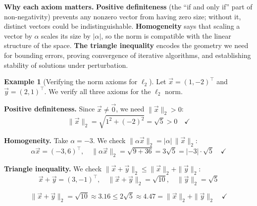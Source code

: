 \documentclass[10pt, twocolumn]{article}
\theoremstyle{definition}
\newtheorem{example}{Example}
\theoremstyle{plain}
\begin{document}
\begin{center}
\end{center}

\textbf{Why each axiom matters.}
\textbf{Positive definiteness} (the ``if and only if'' part of non-negativity) prevents any nonzero vector from having zero size; without it, distinct vectors could be indistinguishable.
\textbf{Homogeneity} says that scaling a vector by $\alpha$ scales its size by $|\alpha|$, so the norm is compatible with the linear structure of the space.
\textbf{The triangle inequality} encodes the geometry we need for bounding errors, proving convergence of iterative algorithms, and establishing stability of solutions under perturbation.

\begin{example}[Verifying the norm axioms for $\ell_2$]
Let $\vec{x} = (1, -2)^\top$ and $\vec{y} = (2, 1)^\top$. We verify all three axioms for the $\ell_2$ norm.

\textbf{Positive definiteness.} Since $\vec{x} \ne \vec{0}$, we need $\|\vec{x}\|_2 > 0$:
\[
    \|\vec{x}\|_2 = \sqrt{1^2 + (-2)^2} = \sqrt{5} > 0 \quad \checkmark
\]

\textbf{Homogeneity.} Take $\alpha = -3$. We check $\|\alpha \vec{x}\|_2 = |\alpha| \, \|\vec{x}\|_2$:
\[
    \alpha \vec{x} = (-3, 6)^\top, \quad
    \|\alpha \vec{x}\|_2 = \sqrt{9 + 36} = 3\sqrt{5} = |-3| \cdot \sqrt{5} \quad \checkmark
\]

\textbf{Triangle inequality.} We check $\|\vec{x} + \vec{y}\|_2 \le \|\vec{x}\|_2 + \|\vec{y}\|_2$:
\[
    \vec{x} + \vec{y} = (3, -1)^\top, \quad \|\vec{x} + \vec{y}\|_2 = \sqrt{10}, \quad \|\vec{y}\|_2 = \sqrt{5}
\]
\begin{result}
\[
    \|\vec{x} + \vec{y}\|_2 = \sqrt{10} \approx 3.16 \le 2\sqrt{5} \approx 4.47 = \|\vec{x}\|_2 + \|\vec{y}\|_2 \quad \checkmark
\]
\end{result}
\end{example}
\end{document}
